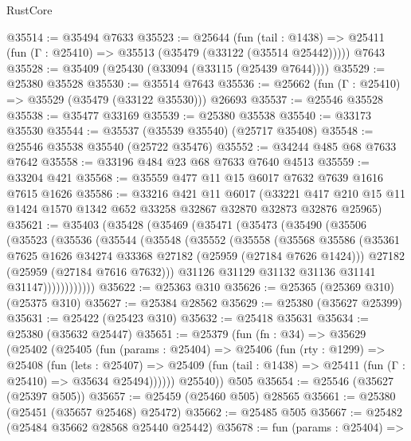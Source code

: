 \begin{lexlean}{RustCore}
\begin{coremodule}
@35514 := @35494 @7633
@35523 := @25644
    (fun (tail : @1438) => @25411 (fun (Γ : @25410) => @35513 (@35479 (@33122 (@35514 @25442)))))
    @7643
@35528 := @35409 (@25430 (@33094 (@33115 (@25439 @7644))))
@35529 := @25380 @35528
@35530 := @35514 @7643
@35536 := @25662 (fun (Γ : @25410) => @35529 (@35479 (@33122 @35530))) @26693
@35537 := @25546 @35528
@35538 := @35477 @33169
@35539 := @25380 @35538
@35540 := @33173 @35530
@35544 := @35537 (@35539 @35540) (@25717 @35408)
@35548 := @25546 @35538 @35540 (@25722 @35476)
@35552 := @34244 @485 @68 @7633 @7642
@35558 := @33196 @484 @23 @68 @7633 @7640 @4513
@35559 := @33204 @421
@35568 := @35559 @477 @11 @15 @6017 @7632 @7639 @1616 @7615 @1626
@35586 := @33216
    @421
    @11
    @6017
    (@33221 @417 @210 @15 @11 @1424 @1570 @1342 @652 @33258 @32867 @32870 @32873 @32876 @25965)
@35621 := @35403
    (@35428
      (@35469
        (@35471
          (@35473
            (@35490
              (@35506
                (@35523
                  (@35536
                    (@35544
                      (@35548
                        (@35552
                          (@35558
                            (@35568
                              @35586
                              (@35361
                                @7625
                                @1626
                                @34274
                                @33368
                                @27182
                                (@25959 (@27184 @7626 @1424)))
                              @27182
                              (@25959 (@27184 @7616 @7632)))
                            @31126
                            @31129
                            @31132
                            @31136
                            @31141
                            @31147))))))))))))
@35622 := @25363 @310
@35626 := @25365 (@25369 @310) (@25375 @310)
@35627 := @25384 @28562
@35629 := @25380 (@35627 @25399)
@35631 := @25422 (@25423 @310)
@35632 := @25418 @35631
@35634 := @25380 (@35632 @25447)
@35651 := @25379
    (fun (fn : @34) =>
    @35629
      (@25402
        (@25405
          (fun (params : @25404) =>
          @25406
            (fun (rty : @1299) =>
            @25408
              (fun (lets : @25407) =>
              @25409 (fun (tail : @1438) => @25411 (fun (Γ : @25410) => @35634 @25494))))))
        @25540))
    @505
@35654 := @25546 (@35627 (@25397 @505))
@35657 := @25459 (@25460 @505) @28565
@35661 := @25380 (@25451 (@35657 @25468) @25472)
@35662 := @25485 @505
@35667 := @25482 (@25484 @35662 @28568 @25440 @25442)
@35678 := fun (params : @25404) =>

\end{coremodule}
\end{lexlean}
